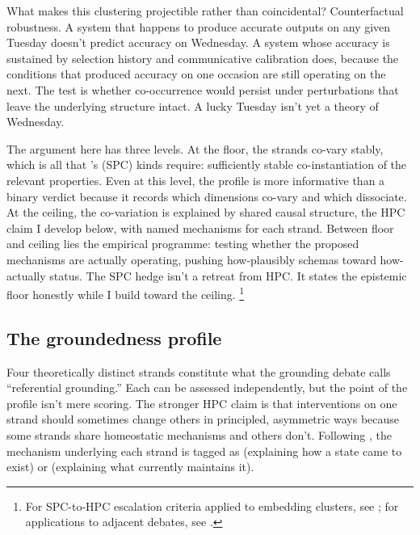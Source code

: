 \documentclass[12pt]{article}
\begin{document}
What makes this clustering projectible rather than coincidental? Counterfactual robustness. A system that happens to produce accurate outputs on any given Tuesday doesn't predict accuracy on Wednesday. A system whose accuracy is sustained by selection history and communicative calibration does, because the conditions that produced accuracy on one occasion are still operating on the next. The test is whether co-occurrence would persist under perturbations that leave the underlying structure intact. A lucky Tuesday isn't yet a theory of Wednesday.

The argument here has three levels. At the floor, the strands co-vary stably, which is all that \textcite{slater_2015_natural_kindness}'s  (SPC) kinds require: sufficiently stable co-instantiation of the relevant properties.
Even at this level, the profile is more informative than a binary verdict because it records which dimensions co-vary and which dissociate. At the ceiling, the co-variation is explained by shared causal structure, the HPC claim I develop below, with named mechanisms for each strand. Between floor and ceiling lies the empirical programme: testing whether the proposed mechanisms are actually operating, pushing how-plausibly schemas toward how-actually status. The SPC hedge isn't a retreat from HPC. It states the epistemic floor honestly while I build toward the ceiling.%
\footnote{For SPC-to-HPC escalation criteria applied to embedding clusters, see \textcite{reynolds2026vectors}; for applications to adjacent debates, see \textcite{reynolds2025agi,reynolds2026llms}.}

\subsection{The groundedness profile}
\label{sec:predictions}

Four theoretically distinct strands constitute what the grounding debate calls \enquote{referential grounding.} Each can be assessed independently, but the point of the profile isn't mere scoring. The stronger HPC claim is that interventions on one strand should sometimes change others in principled, asymmetric ways because some strands share homeostatic mechanisms and others don't. Following \textcite[125]{glennan_2017_new_mechanical_philosophy}, the mechanism underlying each strand is tagged as  (explaining how a state came to exist) or  (explaining what currently maintains it).
\end{document}

